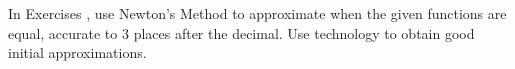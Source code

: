 {\noindent In Exercises}
{, use Newton's Method to approximate when the given functions are equal, accurate to 3 places after the decimal. Use technology to obtain good initial approximations.
}

